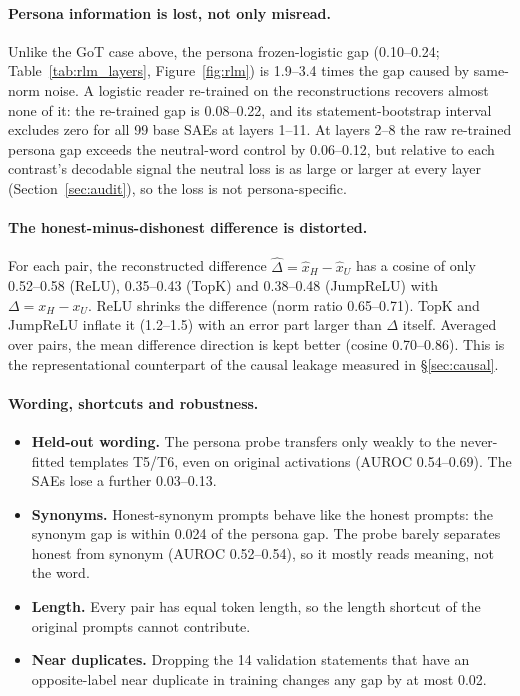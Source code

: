 \paragraph{Persona information is lost, not only misread.} Unlike the GoT case above, the persona frozen-logistic
gap (0.10--0.24; Table~\ref{tab:rlm_layers}, Figure~\ref{fig:rlm}) is 1.9--3.4 times the gap caused by same-norm
noise. A logistic reader re-trained on the reconstructions recovers almost none of it: the re-trained gap is
0.08--0.22, and its statement-bootstrap interval excludes zero for all 99 base SAEs at layers 1--11. At layers 2--8
the raw re-trained persona gap exceeds the neutral-word control by 0.06--0.12, but relative to each contrast's
decodable signal the neutral loss is as large or larger at every layer (Section~\ref{sec:audit}), so the loss is not
persona-specific.

\paragraph{The honest-minus-dishonest difference is distorted.} For each pair, the reconstructed difference
$\hat\Delta=\hat x_H-\hat x_U$ has a cosine of only 0.52--0.58 (ReLU), 0.35--0.43 (TopK) and 0.38--0.48 (JumpReLU)
with $\Delta=x_H-x_U$. ReLU shrinks the difference (norm ratio 0.65--0.71). TopK and JumpReLU inflate it (1.2--1.5)
with an error part larger than $\Delta$ itself. Averaged over pairs, the mean difference direction is kept better
(cosine 0.70--0.86). This is the representational counterpart of the causal leakage measured in
\S\ref{sec:causal}.

\paragraph{Wording, shortcuts and robustness.}
\begin{itemize}
  \item \textbf{Held-out wording.} The persona probe transfers only weakly to the never-fitted templates T5/T6, even
        on original activations (AUROC 0.54--0.69). The SAEs lose a further 0.03--0.13.
  \item \textbf{Synonyms.} Honest-synonym prompts behave like the honest prompts: the synonym gap is within 0.024 of
        the persona gap. The probe barely separates honest from synonym (AUROC 0.52--0.54), so it mostly reads
        meaning, not the word.
  \item \textbf{Length.} Every pair has equal token length, so the length shortcut of the original prompts cannot
        contribute.
  \item \textbf{Near duplicates.} Dropping the 14 validation statements that have an opposite-label near duplicate in
        training changes any gap by at most 0.02.
\end{itemize}

